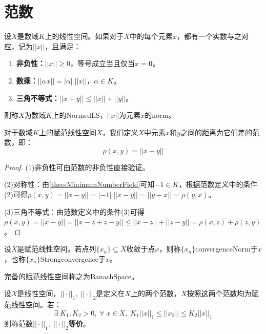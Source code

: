 \section{范数}
\begin{definition}
	设$X$是数域$K$上的线性空间。如果对于$X$中的每个元素$x$，都有一个实数与之对应，记为$||x||$，且满足：
	\begin{enumerate}
		\item \textbf{非负性：}$||x||\geqslant 0$，等号成立当且仅当$x=\mathbf{0}$。
		\item \textbf{数乘：}$||\alpha x||=|\alpha|\;||x||$，$\alpha\in K$。
		\item \textbf{三角不等式：}$||x+y||\leqslant||x||+||y||$。
	\end{enumerate}
	则称$X$为数域$K$上的\gls{NormedLS}，$||x||$为元素$x$的\gls{norm}。
\end{definition}
\begin{definition}
	对于数域$K$上的赋范线性空间$X$，我们定义$X$中元素$x$和$y$之间的距离为它们差的范数，即：
	\begin{equation*}
		\rho(x,y)=||x-y||
	\end{equation*}
\end{definition}
\begin{proof}
	(1)非负性可由范数的非负性直接验证。\par
	(2)对称性：由\cref{theo:MinimumNumberField}可知$-1\in K$，根据范数定义中的条件(2)可得$\rho(x,y)=||x-y||=|-1|\;||x-y||=||y-x||=\rho(y,x)$。\par
	(3)三角不等式：由范数定义中的条件(3)可得$\rho(x,y)=||x-y||=||x-z+z-y||\leqslant||x-z||+||z-y||=\rho(x,z)+\rho(z,y)$。
\end{proof}
\begin{definition}
	设$X$是赋范线性空间。若点列$\{x_n\}\subseteq X$收敛于点$x$，则称$\{x_n\}$\gls{convergenceNorm}于$x$，也称$\{x_n\}$\gls{Strongconvergence}于$x$。
\end{definition}
\begin{definition}
	完备的赋范线性空间称之为\gls{BanachSpace}。
\end{definition}
\begin{definition}
	设$X$是线性空间，$||\cdot||_1,\;||\cdot||_2$是定义在$X$上的两个范数，$X$按照这两个范数均为赋范线性空间。若：
	\begin{equation*}
		\exists\;K_1,K_2>0,\;\forall\;x\in X,\;K_1||x||_1\leqslant||x_2||\leqslant K_2||x||_1
	\end{equation*}
	则称范数$||\cdot||_1,\;||\cdot||_2$\textbf{等价}。
\end{definition}
